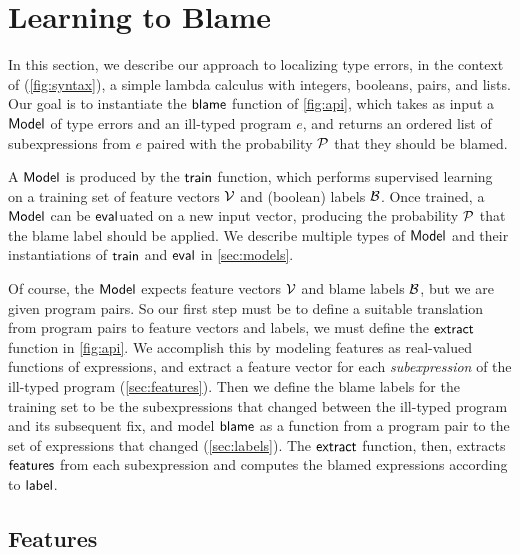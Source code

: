\section{Learning to Blame}
\label{sec:learning}
In this section, we describe our approach to localizing type errors, in the
context
of \lang (\autoref{fig:syntax}), a simple lambda calculus with integers,
booleans, pairs, and lists.
%
Our goal is to instantiate the $\mathsf{blame}$ function of
\autoref{fig:api}, which takes as input a $\mathsf{Model}$ of type errors and an
ill-typed program $e$, and returns an ordered list of subexpressions
from $e$ paired with the probability $\mathcal{P}$ that they should be
blamed.

A $\mathsf{Model}$ is produced by the $\mathsf{train}$ function, which performs
supervised learning on a training set of feature vectors $\mathcal{V}$ and
(boolean) labels $\mathcal{B}$.
%
Once trained, a $\mathsf{Model}$ can be $\mathsf{eval}$uated on a new input vector,
producing the probability $\mathcal{P}$ that the blame label should be
applied.
%
We describe multiple types of $\mathsf{Model}$ and their instantiations of
$\mathsf{train}$ and $\mathsf{eval}$ in \autoref{sec:models}.

Of course, the $\mathsf{Model}$ expects feature vectors $\mathcal{V}$ and blame labels
$\mathcal{B}$, but we are given program pairs.
%
So our first step must be to define a suitable translation from program
pairs to feature vectors and labels, \ie we must define the
$\mathsf{extract}$ function in \autoref{fig:api}.
%
We accomplish this by modeling features as real-valued functions of
expressions, and extract a feature vector for each \emph{subexpression}
of the ill-typed program (\autoref{sec:features}).
%
Then we define the blame labels for the training set to be the
subexpressions that changed between the ill-typed program and its
subsequent fix, and model $\mathsf{blame}$ as a function from a program pair
to the set of expressions that changed (\autoref{sec:labels}).
%
The $\mathsf{extract}$ function, then, extracts $\mathsf{features}$ from each
subexpression and computes the blamed expressions according to
$\mathsf{label}$.




\subsection{Features}
\label{sec:features}

